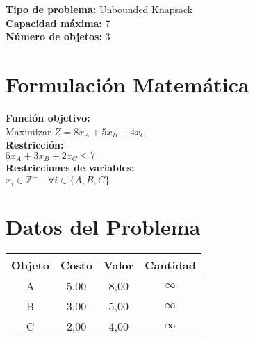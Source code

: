 \documentclass{article}
\begin{document}
\thispagestyle{empty}
\newpage
\textbf{Tipo de problema:} Unbounded Knapsack\\
\textbf{Capacidad máxima:} 7\\
\textbf{Número de objetos:} 3\\

\section*{Formulación Matemática}
\textbf{Función objetivo:}\\
Maximizar $Z = 8 x_{A} + 5 x_{B} + 4 x_{C}$\\

\textbf{Restricción:}\\
$5 x_{A} + 3 x_{B} + 2 x_{C} \leq 7$\\

\textbf{Restricciones de variables:}\\
$x_i \in \mathbb{Z}^+ \quad \forall i \in \{A, B, C\}$\\
\vspace{0.5cm}

\section*{Datos del Problema}
\begin{tabular}{|c|c|c|c|}
\hline
Objeto & Costo & Valor & Cantidad \\
\hline
A & 5,00 & 8,00 & $\infty$ \\
B & 3,00 & 5,00 & $\infty$ \\
C & 2,00 & 4,00 & $\infty$ \\
\hline
\end{tabular}
\end{document}
